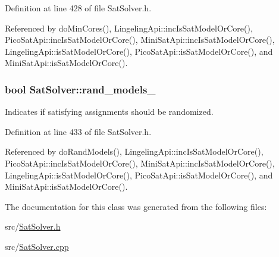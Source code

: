 Definition at line 428 of file Sat\-Solver.\-h.



Referenced by do\-Min\-Cores(), Lingeling\-Api\-::inc\-Is\-Sat\-Model\-Or\-Core(), Pico\-Sat\-Api\-::inc\-Is\-Sat\-Model\-Or\-Core(), Mini\-Sat\-Api\-::inc\-Is\-Sat\-Model\-Or\-Core(), Lingeling\-Api\-::is\-Sat\-Model\-Or\-Core(), Pico\-Sat\-Api\-::is\-Sat\-Model\-Or\-Core(), and Mini\-Sat\-Api\-::is\-Sat\-Model\-Or\-Core().

\hypertarget{classSatSolver_a73fed24d8fb4da85ef82dc53ac5f28c7}{
\subsubsection[{rand\-\_\-models\-\_\-}]{\setlength{\rightskip}{0pt plus 5cm}bool Sat\-Solver\-::rand\-\_\-models\-\_\-\hspace{0.3cm}{\ttfamily [protected]}}}\label{classSatSolver_a73fed24d8fb4da85ef82dc53ac5f28c7}


Indicates if satisfying assignments should be randomized. 



Definition at line 433 of file Sat\-Solver.\-h.



Referenced by do\-Rand\-Models(), Lingeling\-Api\-::inc\-Is\-Sat\-Model\-Or\-Core(), Pico\-Sat\-Api\-::inc\-Is\-Sat\-Model\-Or\-Core(), Mini\-Sat\-Api\-::inc\-Is\-Sat\-Model\-Or\-Core(), Lingeling\-Api\-::is\-Sat\-Model\-Or\-Core(), Pico\-Sat\-Api\-::is\-Sat\-Model\-Or\-Core(), and Mini\-Sat\-Api\-::is\-Sat\-Model\-Or\-Core().



The documentation for this class was generated from the following files\-:\begin{DoxyCompactItemize}
\item 
src/\hyperlink{SatSolver_8h}{Sat\-Solver.\-h}\item 
src/\hyperlink{SatSolver_8cpp}{Sat\-Solver.\-cpp}\end{DoxyCompactItemize}
